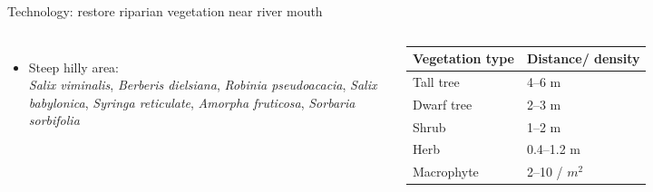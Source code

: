 \begin{frame}{Technology: restore riparian vegetation near river mouth}
\begin{columns}[T,onlytextwidth]
\begin{itemize}
		\small
		\item Steep hilly area:\\
		\tiny
		\emph{Salix viminalis}, \emph{Berberis dielsiana}, \emph{Robinia pseudoacacia}, \emph{Salix babylonica}, \emph{Syringa reticulate}, \textcolor{colshrub}{\emph{Amorpha fruticosa}}, \textcolor{colshrub}{\emph{Sorbaria sorbifolia}}\\
	\end{itemize}
	
        \small
	\begin{table}
		\begin{tabular}{p{5em}| p{5em}}
			\toprule
			Vegetation type&Distance/ density\\
			\midrule
			Tall tree&4--6 m\\
			Dwarf tree&2--3 m\\
			\textcolor{colshrub}{Shrub}&1--2 m\\
			\textcolor{colherb}{Herb}&0.4--1.2 m\\
			\textcolor{colherb}{Macrophyte}&2--10  / $m^2$\\
			\bottomrule
		\end{tabular}
	\end{table}
		
\end{columns}
\end{frame}

